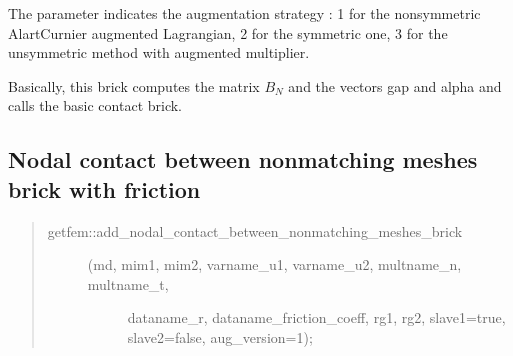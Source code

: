 \documentclass[a4paper,11pt,english]{sphinxmanual}
\begin{document}
The parameter  indicates the augmentation strategy :
1 for the non\sphinxhyphen{}symmetric Alart\sphinxhyphen{}Curnier augmented Lagrangian,
2 for the symmetric one,
3 for the unsymmetric method with augmented multiplier.

Basically, this brick computes the matrix \(B_N\) and the vectors
gap and alpha and calls the basic contact brick.


\subsection{Nodal contact between non\sphinxhyphen{}matching meshes brick with friction}
\label{\detokenize{userdoc/model_contact_friction:nodal-contact-between-non-matching-meshes-brick-with-friction}}\begin{quote}
\begin{description}
\item[{getfem::add\_nodal\_contact\_between\_nonmatching\_meshes\_brick}] \leavevmode\begin{description}
\item[{(md, mim1, mim2, varname\_u1, varname\_u2, multname\_n, multname\_t,}] \leavevmode
dataname\_r, dataname\_friction\_coeff, rg1, rg2, slave1=true,
slave2=false, aug\_version=1);

\end{description}

\end{description}
\end{quote}
\end{document}
